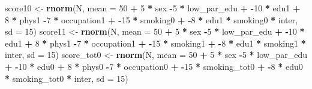 \documentclass[
]{book}
\newenvironment{Shaded}{\begin{snugshade}}{\end{snugshade}}
\newcommand{\AttributeTok}[1]{\textcolor[rgb]{0.13,0.29,0.53}{#1}}
\newcommand{\DecValTok}[1]{\textcolor[rgb]{0.00,0.00,0.81}{#1}}
\newcommand{\FunctionTok}[1]{\textcolor[rgb]{0.13,0.29,0.53}{\textbf{#1}}}
\newcommand{\NormalTok}[1]{#1}
\newcommand{\OtherTok}[1]{\textcolor[rgb]{0.56,0.35,0.01}{#1}}
\newcommand{\SpecialCharTok}[1]{\textcolor[rgb]{0.81,0.36,0.00}{\textbf{#1}}}
\begin{document}
\begin{Shaded}
\begin{Highlighting}[]
\NormalTok{  score10 }\OtherTok{\textless{}{-}} \FunctionTok{rnorm}\NormalTok{(N, }\AttributeTok{mean =} \DecValTok{50} \SpecialCharTok{+} \DecValTok{5} \SpecialCharTok{*}\NormalTok{ sex  }\SpecialCharTok{{-}}\DecValTok{5} \SpecialCharTok{*}\NormalTok{ low\_par\_edu }\SpecialCharTok{+} 
                     \SpecialCharTok{{-}}\DecValTok{10} \SpecialCharTok{*}\NormalTok{ edu1 }\SpecialCharTok{+} \DecValTok{8} \SpecialCharTok{*}\NormalTok{ phys1 }\SpecialCharTok{{-}}\DecValTok{7} \SpecialCharTok{*}\NormalTok{ occupation1 }\SpecialCharTok{+} 
                     \SpecialCharTok{{-}}\DecValTok{15} \SpecialCharTok{*}\NormalTok{ smoking0 }\SpecialCharTok{+} \SpecialCharTok{{-}}\DecValTok{8} \SpecialCharTok{*}\NormalTok{ edu1 }\SpecialCharTok{*}\NormalTok{ smoking0 }\SpecialCharTok{*}\NormalTok{ inter,}
                   \AttributeTok{sd =} \DecValTok{15}\NormalTok{)   }
\NormalTok{  score11 }\OtherTok{\textless{}{-}} \FunctionTok{rnorm}\NormalTok{(N, }\AttributeTok{mean =} \DecValTok{50} \SpecialCharTok{+} \DecValTok{5} \SpecialCharTok{*}\NormalTok{ sex  }\SpecialCharTok{{-}}\DecValTok{5} \SpecialCharTok{*}\NormalTok{ low\_par\_edu }\SpecialCharTok{+} 
                     \SpecialCharTok{{-}}\DecValTok{10} \SpecialCharTok{*}\NormalTok{ edu1 }\SpecialCharTok{+} \DecValTok{8} \SpecialCharTok{*}\NormalTok{ phys1 }\SpecialCharTok{{-}}\DecValTok{7} \SpecialCharTok{*}\NormalTok{ occupation1 }\SpecialCharTok{+} 
                     \SpecialCharTok{{-}}\DecValTok{15} \SpecialCharTok{*}\NormalTok{ smoking1 }\SpecialCharTok{+} \SpecialCharTok{{-}}\DecValTok{8} \SpecialCharTok{*}\NormalTok{ edu1 }\SpecialCharTok{*}\NormalTok{ smoking1 }\SpecialCharTok{*}\NormalTok{ inter, }
                   \AttributeTok{sd =} \DecValTok{15}\NormalTok{)   }
\NormalTok{  score\_tot0 }\OtherTok{\textless{}{-}} \FunctionTok{rnorm}\NormalTok{(N, }\AttributeTok{mean =} \DecValTok{50} \SpecialCharTok{+} \DecValTok{5} \SpecialCharTok{*}\NormalTok{ sex  }\SpecialCharTok{{-}}\DecValTok{5} \SpecialCharTok{*}\NormalTok{ low\_par\_edu }\SpecialCharTok{+} 
                        \SpecialCharTok{{-}}\DecValTok{10} \SpecialCharTok{*}\NormalTok{ edu0 }\SpecialCharTok{+} \DecValTok{8} \SpecialCharTok{*}\NormalTok{ phys0 }\SpecialCharTok{{-}}\DecValTok{7} \SpecialCharTok{*}\NormalTok{ occupation0 }\SpecialCharTok{+} 
                        \SpecialCharTok{{-}}\DecValTok{15} \SpecialCharTok{*}\NormalTok{ smoking\_tot0 }\SpecialCharTok{+} \SpecialCharTok{{-}}\DecValTok{8} \SpecialCharTok{*}\NormalTok{ edu0 }\SpecialCharTok{*}\NormalTok{ smoking\_tot0 }\SpecialCharTok{*}\NormalTok{ inter, }
                      \AttributeTok{sd =} \DecValTok{15}\NormalTok{)}

\end{Highlighting}
\end{Shaded}
\end{document}
